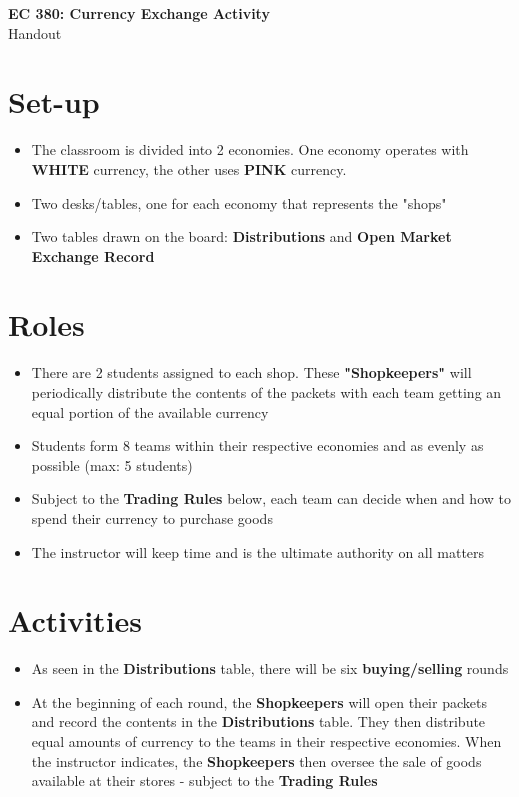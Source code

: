 \documentclass[11pt]{article}
\begin{document}
\selectfont

\begin{center}
    \textbf{\huge EC 380: Currency Exchange Activity}\\ 
    \vspace{0.1in}
    Handout
\end{center}

\section*{Set-up}

\begin{itemize}
    \item The classroom is divided into 2 economies. 
    One economy operates with \textbf{WHITE} currency, the other uses \textbf{PINK} currency. 
    \item Two desks/tables, one for each economy that represents the "shops"
    \item Two tables drawn on the board: \textbf{Distributions} and \textbf{Open Market Exchange Record}
\end{itemize}

\section*{Roles}

\begin{itemize}
    \item There are 2 students assigned to each shop.
    These \textbf{"Shopkeepers"} will periodically distribute the contents of the packets with each team getting an equal portion of the available currency
    \item Students form 8 teams within their respective economies and as evenly as possible (max: 5 students)
    \item Subject to the \textbf{Trading Rules} below, each team can decide when and how to spend their currency to purchase goods
    \item The instructor will keep time and is the ultimate authority on all matters
\end{itemize}

\section*{Activities}

\begin{itemize}
    \item As seen in the \textbf{Distributions} table, there will be six \textbf{buying/selling} rounds
    \item At the beginning of each round, the \textbf{Shopkeepers} will open their packets and record the contents in the \textbf{Distributions} table.
    They then distribute equal amounts of currency to the teams in their respective economies.
    When the instructor indicates, the \textbf{Shopkeepers} then oversee the sale of goods available at their stores - subject to the \textbf{Trading Rules}
\end{itemize}
\end{document}
